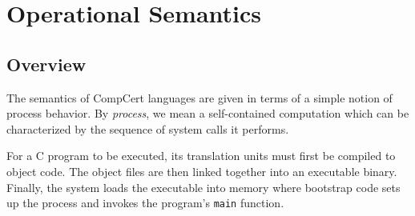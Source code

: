 \documentclass[sigplan,10pt,review,anonymous]{acmart}\settopmatter{printfolios=true,printccs=false,printacmref=false}
\begin{document}




\section{Operational Semantics} \label{sec:sem} %


\subsection{Overview} \label{sec:sem:overview} %

The semantics of CompCert languages
are given in terms of a simple notion of process behavior.
By \emph{process}, we mean a self-contained computation
which can be characterized by
the sequence of system calls it performs.

For a C program to be executed,
its translation units must first be compiled to object code.
The object files are then linked together
into an executable binary.
Finally, the system loads the executable into memory
where bootstrap code sets up the process
and invokes the program's \texttt{main} function.
\end{document}
